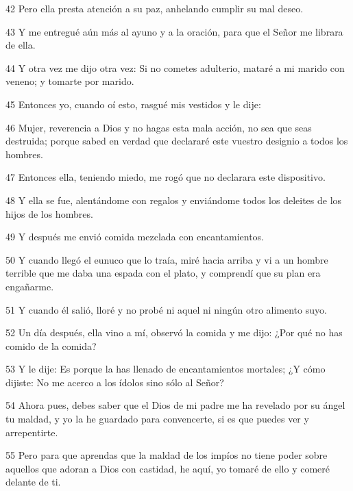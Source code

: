 \par 42 Pero ella presta atención a su paz, anhelando cumplir su mal deseo.

\par 43 Y me entregué aún más al ayuno y a la oración, para que el Señor me librara de ella.

\par 44 Y otra vez me dijo otra vez: Si no cometes adulterio, mataré a mi marido con veneno; y tomarte por marido.

\par 45 Entonces yo, cuando oí esto, rasgué mis vestidos y le dije:

\par 46 Mujer, reverencia a Dios y no hagas esta mala acción, no sea que seas destruida; porque sabed en verdad que declararé este vuestro designio a todos los hombres.

\par 47 Entonces ella, teniendo miedo, me rogó que no declarara este dispositivo.

\par 48 Y ella se fue, alentándome con regalos y enviándome todos los deleites de los hijos de los hombres.

\par 49 Y después me envió comida mezclada con encantamientos.

\par 50 Y cuando llegó el eunuco que lo traía, miré hacia arriba y vi a un hombre terrible que me daba una espada con el plato, y comprendí que su plan era engañarme.

\par 51 Y cuando él salió, lloré y no probé ni aquel ni ningún otro alimento suyo.

\par 52 Un día después, ella vino a mí, observó la comida y me dijo: ¿Por qué no has comido de la comida?

\par 53 Y le dije: Es porque la has llenado de encantamientos mortales; ¿Y cómo dijiste: No me acerco a los ídolos sino sólo al Señor?

\par 54 Ahora pues, debes saber que el Dios de mi padre me ha revelado por su ángel tu maldad, y yo la he guardado para convencerte, si es que puedes ver y arrepentirte.

\par 55 Pero para que aprendas que la maldad de los impíos no tiene poder sobre aquellos que adoran a Dios con castidad, he aquí, yo tomaré de ello y comeré delante de ti.

